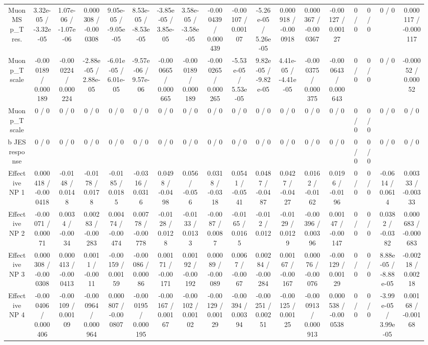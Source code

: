 \documentclass[10pt]{article}
\begin{document}
\begin{table}[htbp]
\begin{center}
\begin{tabular}{|c|c|c|c|c|c|c|c|c|c|c|c|c|c|c|c|c|c|}
  Muon MS p_{T} res. & 3.32e-05 / -3.32e-05 & 1.07e-06 / -1.07e-06 & 0.000308 / -0.000308 & 9.05e-05 / -9.05e-05 & 8.53e-05 / -8.53e-05 & -3.85e-05 / 3.85e-05 & 3.58e-05 / -3.58e-05 & -0.000439 / 0.000439 & -0.00107 / 0.00107 & -5.26e-05 / 5.26e-05 & 0.000918 / -0.000918 & 0.000367 / -0.000367 & -0.00127 / 0.00127 & 0 / 0 & 0 / 0 & 0 / 0 & 0.000117 / -0.000117 \\ 
  Muon p_{T} scale & -0.000189 / 0.000189 & -0.000224 / 0.000224 & -2.88e-05 / 2.88e-05 & -6.01e-05 / 6.01e-05 & -9.57e-06 / 9.57e-06 & -0.000665 / 0.000665 & -0.000189 / 0.000189 & -0.000265 / 0.000265 & -5.53e-05 / 5.53e-05 & 9.82e-05 / -9.82e-05 & 4.41e-05 / -4.41e-05 & -0.000375 / 0.000375 & -0.000643 / 0.000643 & 0 / 0 & 0 / 0 & 0 / 0 & -0.00052 / 0.00052 \\ 
  Muon p_{T} scale & 0 / 0 & 0 / 0 & 0 / 0 & 0 / 0 & 0 / 0 & 0 / 0 & 0 / 0 & 0 / 0 & 0 / 0 & 0 / 0 & 0 / 0 & 0 / 0 & 0 / 0 & 0 / 0 & 0 / 0 & 0 / 0 & 0 / 0 \\ 
  b JES response & 0 / 0 & 0 / 0 & 0 / 0 & 0 / 0 & 0 / 0 & 0 / 0 & 0 / 0 & 0 / 0 & 0 / 0 & 0 / 0 & 0 / 0 & 0 / 0 & 0 / 0 & 0 / 0 & 0 / 0 & 0 / 0 & 0 / 0 \\ 
  Effective NP 1 & 0.000418 / -0.000418 & -0.0148 / 0.0148 & -0.0178 / 0.0178 & -0.0185 / 0.0185 & -0.0316 / 0.0316 & 0.0498 / -0.0498 & 0.056 / -0.056 & 0.0318 / -0.0318 & 0.0541 / -0.0541 & 0.0487 / -0.0487 & 0.0427 / -0.0427 & 0.0162 / -0.0162 & 0.0196 / -0.0196 & 0 / 0 & 0 / 0 & -0.0614 / 0.0614 & 0.00333 / -0.00333 \\ 
  Effective NP 2 & -0.00071 / 0.00071 & 0.0034 / -0.0034 & 0.00283 / -0.00283 & 0.00474 / -0.00474 & 0.00778 / -0.00778 & -0.0128 / 0.0128 & -0.0133 / 0.0133 & -0.0087 / 0.0087 & -0.0165 / 0.0165 & -0.012 / 0.012 & -0.0129 / 0.0129 & -0.00396 / 0.00396 & 0.00147 / -0.00147 & 0 / 0 & 0 / 0 & 0.0382 / -0.0382 & 0.000683 / -0.000683 \\ 
  Effective NP 3 & 0.000308 / -0.000308 & 0.000413 / -0.000413 & 0.0011 / -0.0011 & -0.00159 / 0.00159 & -0.00086 / 0.00086 & 0.00171 / -0.00171 & 0.00192 / -0.00192 & 0.00089 / -0.00089 & 0.0067 / -0.0067 & 0.00284 / -0.00284 & 0.00167 / -0.00167 & 0.00076 / -0.00076 & -0.00129 / 0.00129 & 0 / 0 & 0 / 0 & 8.88e-05 / -8.88e-05 & -0.00218 / 0.00218 \\ 
  Effective NP 4 & -0.000406 / 0.000406 & -0.00109 / 0.00109 & -0.000964 / 0.000964 & 0.000807 / -0.000807 & -0.000195 / 0.000195 & -0.00167 / 0.00167 & -0.00102 / 0.00102 & -0.00129 / 0.00129 & -0.00394 / 0.00394 & -0.00251 / 0.00251 & -0.00125 / 0.00125 & -0.000913 / 0.000913 & 0.000538 / -0.000538 & 0 / 0 & 0 / 0 & -3.99e-05 / 3.99e-05 & 0.00168 / -0.00168 \\ 

\end{tabular}
\end{center}
\end{table}
\end{document}
